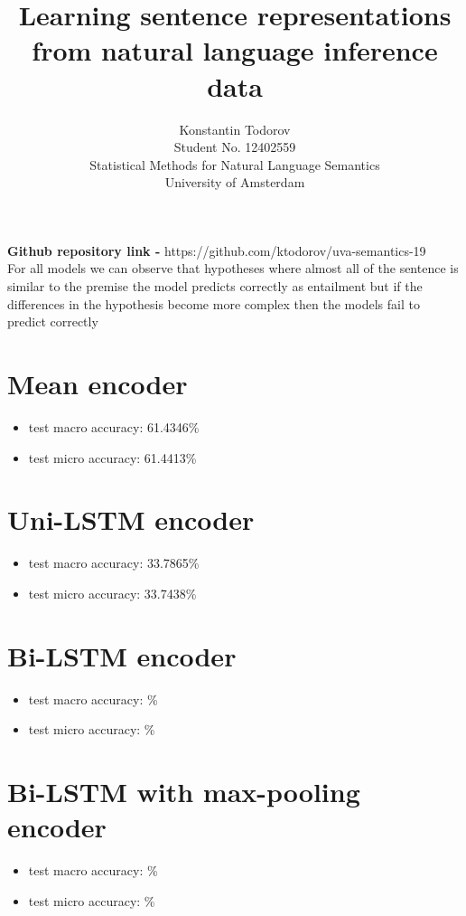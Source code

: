 \documentclass[8pt]{article}
\title{
  Learning sentence representations from natural language inference data}
\author{%
  Konstantin Todorov \\
  Student No. 12402559 \\
  Statistical Methods for Natural Language Semantics\\
  University of Amsterdam\\
}
\begin{document}
\maketitle

\textbf{Github repository link - } https://github.com/ktodorov/uva-semantics-19\\

For all models we can observe that hypotheses where almost all of the sentence 
is similar to the premise the model predicts correctly as entailment but if
the differences in the hypothesis become more complex then the models fail
to predict correctly

\section{Mean encoder}

\begin{itemize}
  \item test macro accuracy: 61.4346\%
  
  \item test micro accuracy: 61.4413\%
\end{itemize}

\section{Uni-LSTM encoder}

\begin{itemize}
  \item test macro accuracy: 33.7865\%
  
  \item test micro accuracy: 33.7438\%
\end{itemize}

\section{Bi-LSTM encoder}

\begin{itemize}
  \item test macro accuracy: \%
  
  \item test micro accuracy: \%
\end{itemize}

\section{Bi-LSTM with max-pooling encoder}

\begin{itemize}
  \item test macro accuracy: \%
  
  \item test micro accuracy: \%
\end{itemize}
\end{document}
